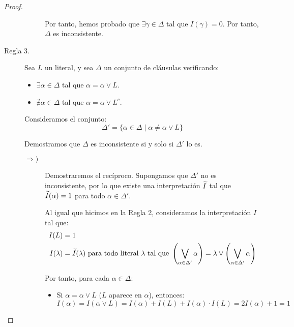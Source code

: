 \begin{teo}
\begin{proof}
\begin{description}
\begin{description}
                    Por tanto, hemos probado que $\exists \gamma\in \Delta$ tal que $I(\gamma)=0$. Por tanto, $\Delta$ es inconsistente.
                \end{description}

                \item[Regla 3.] Sea $L$ un literal, y sea $\Delta$ un conjunto de cláusulas verificando:
                \begin{itemize}
                    \item $\exists \alpha\in \Delta$ tal que $\alpha=\alpha\lor L$.
                    \item $\nexists \alpha\in \Delta$ tal que $\alpha=\alpha\lor L^c$.
                \end{itemize}

                Consideramos el conjunto:
                \begin{equation*}
                    \Delta'=\{\alpha\in \Delta\mid \alpha\neq \alpha\lor L\}
                \end{equation*}

                Demostramos que $\Delta$ es inconsistente si y solo si $\Delta'$ lo es.
                \begin{description}
                    \item[$\Longrightarrow)$] Demostraremos el recíproco. Supongamos que $\Delta'$ no es inconsistente, por lo que existe una interpretación $\widetilde{I}$ tal que $\widetilde{I}(\alpha)=1$ para todo $\alpha\in \Delta'$.
                    
                    Al igual que hicimos en la Regla 2, consideramos la interpretación $I$ tal que:
                    \begin{align*}
                        I(L)&=1\\
                        I(\lambda)&=\widetilde{I}(\lambda)\ \text{para todo literal}\ \lambda\ \text{tal que} \ \left(\bigvee_{\alpha\in \Delta'} \alpha\right)=\lambda\lor \left(\bigvee_{\alpha\in \Delta'} \alpha\right)
                    \end{align*}

                    Por tanto, para cada $\alpha\in \Delta$:
                    \begin{itemize}
                        \item Si $\alpha=\alpha\lor L$ ($L$ aparece en $\alpha$), entonces:
                        \begin{equation*}
                            I(\alpha)=I(\alpha\lor L)=I(\alpha)+I(L)+I(\alpha)\cdot I(L)=2I(\alpha)+1=1
                        \end{equation*}


\end{itemize}
\end{description}
\end{description}
\end{proof}
\end{teo}
